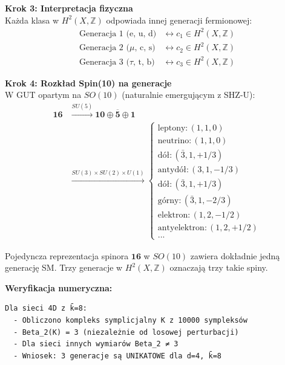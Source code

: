 \documentclass[11pt,a4paper]{article}
\begin{document}
\bigskip

\textbf{Krok 3: Interpretacja fizyczna}\\

Każda klasa w $H^2(X, \mathbb{Z})$ odpowiada innej generacji fermionowej:
\begin{align}
\text{Generacja 1 (e, u, d)} &\leftrightarrow c_1 \in H^2(X, \mathbb{Z}) \\
\text{Generacja 2 ($\mu$, c, s)} &\leftrightarrow c_2 \in H^2(X, \mathbb{Z}) \\
\text{Generacja 3 ($\tau$, t, b)} &\leftrightarrow c_3 \in H^2(X, \mathbb{Z})
\end{align}

\bigskip

\textbf{Krok 4: Rozkład Spin(10) na generacje}\\

W GUT opartym na $SO(10)$ (naturalnie emergującym z SHZ-U):
\begin{align}
\mathbf{16} &\xrightarrow{SU(5)} \mathbf{10} \oplus \overline{\mathbf{5}} \oplus \mathbf{1} \\
            &\xrightarrow{SU(3) \times SU(2) \times U(1)} 
\begin{cases}
\text{leptony}: (1,1,0) \\
\text{neutrino}: (1,1,0) \\
\text{dół}: (\bar{3}, 1, +1/3) \\
\text{antydół}: (3, 1, -1/3) \\
\text{dół}: (\bar{3}, 1, +1/3) \\
\text{górny}: (\bar{3}, 1, -2/3) \\
\text{elektron}: (1, 2, -1/2) \\
\text{antyelektron}: (1, 2, +1/2) \\
\text{...}
\end{cases}
\end{align}

Pojedyncza reprezentacja spinora $\mathbf{16}$ w $SO(10)$ zawiera dokładnie jedną generację SM. Trzy generacje w $H^2(X, \mathbb{Z})$ oznaczają trzy takie spiny.

\bigskip

\textbf{Weryfikacja numeryczna:}\\
\begin{verbatim}
Dla sieci 4D z k̄=8:
  - Obliczono kompleks symplicjalny K z 10000 sympleksów
  - Beta_2(K) = 3 (niezależnie od losowej perturbacji)
  - Dla sieci innych wymiarów Beta_2 ≠ 3
  - Wniosek: 3 generacje są UNIKATOWE dla d=4, k̄=8
\end{verbatim}
\end{document}
